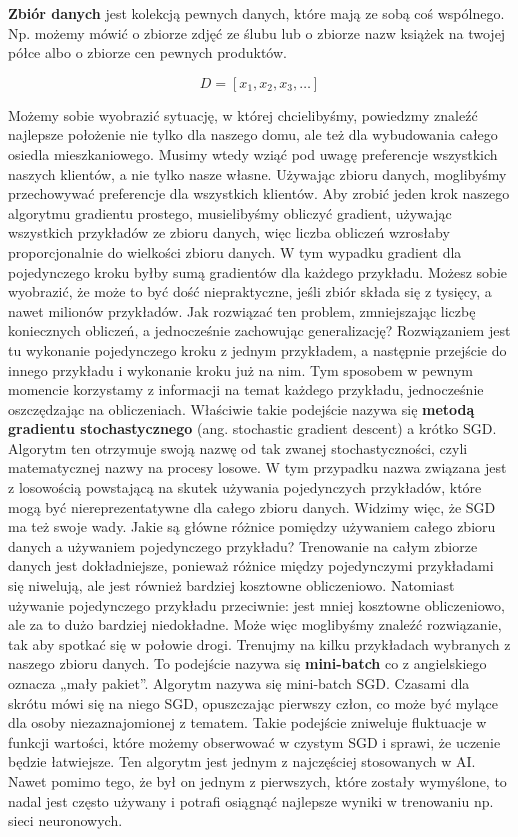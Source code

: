 \noindent \textbf{Zbiór danych} jest kolekcją pewnych danych, które mają ze sobą coś wspólnego. Np. możemy mówić o zbiorze zdjęć ze ślubu lub o zbiorze nazw książek na twojej półce albo o zbiorze cen pewnych produktów.

\begin{equation}
D = [x_1, x_2, x_3, …]
\end{equation}

Możemy sobie wyobrazić sytuację, w której chcielibyśmy, powiedzmy znaleźć najlepsze położenie nie tylko dla naszego domu, ale też dla wybudowania całego osiedla mieszkaniowego. Musimy wtedy wziąć pod uwagę preferencje wszystkich naszych klientów, a nie tylko nasze własne. Używając zbioru danych, moglibyśmy przechowywać preferencje dla wszystkich klientów. Aby zrobić jeden krok naszego algorytmu gradientu prostego, musielibyśmy obliczyć gradient, używając wszystkich przykładów ze zbioru danych, więc liczba obliczeń wzrosłaby proporcjonalnie do wielkości zbioru danych. W tym wypadku gradient dla pojedynczego kroku byłby sumą gradientów dla każdego przykładu. Możesz sobie wyobrazić, że może to być dość niepraktyczne, jeśli zbiór składa się z tysięcy, a nawet milionów przykładów. Jak rozwiązać ten problem, zmniejszając liczbę koniecznych obliczeń, a jednocześnie zachowując generalizację? Rozwiązaniem jest tu wykonanie pojedynczego kroku z jednym przykładem, a następnie przejście do innego przykładu i wykonanie kroku już na nim. Tym sposobem w pewnym momencie korzystamy z informacji na temat każdego przykładu, jednocześnie oszczędzając na obliczeniach. Właściwie takie podejście nazywa się \textbf{metodą gradientu stochastycznego} (ang. stochastic gradient descent) a krótko SGD. Algorytm ten otrzymuje swoją nazwę od tak zwanej stochastyczności, czyli matematycznej nazwy na procesy losowe. W tym przypadku nazwa związana jest z losowością powstającą na skutek używania pojedynczych przykładów, które mogą być niereprezentatywne dla całego zbioru danych. Widzimy więc, że SGD ma też swoje wady. Jakie są główne różnice pomiędzy używaniem całego zbioru danych a używaniem pojedynczego przykładu? Trenowanie na całym zbiorze danych jest dokładniejsze, ponieważ różnice między pojedynczymi przykładami się niwelują, ale jest również bardziej kosztowne obliczeniowo. Natomiast używanie pojedynczego przykładu przeciwnie: jest mniej kosztowne obliczeniowo, ale za to dużo bardziej niedokładne. Może więc moglibyśmy znaleźć rozwiązanie, tak aby spotkać się w połowie drogi. Trenujmy na kilku przykładach wybranych z naszego zbioru danych. To podejście nazywa się \textbf{mini-batch} co z angielskiego oznacza „mały pakiet”. Algorytm nazywa się mini-batch SGD. Czasami dla skrótu mówi się na niego SGD, opuszczając pierwszy człon, co może być mylące dla osoby niezaznajomionej z tematem. Takie podejście zniweluje fluktuacje w funkcji wartości, które możemy obserwować w czystym SGD i sprawi, że uczenie będzie łatwiejsze. Ten algorytm jest jednym z najczęściej stosowanych w AI. Nawet pomimo tego, że był on jednym z pierwszych, które zostały wymyślone, to nadal jest często używany i potrafi osiągnąć najlepsze wyniki w trenowaniu np. sieci neuronowych.